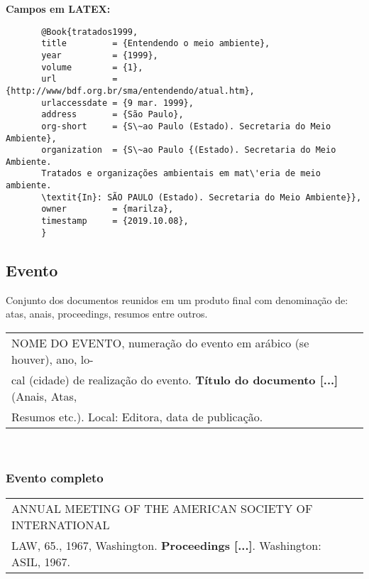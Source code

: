 	  \textbf{Campos em LATEX:} 

	  \begin{verbatim}
	   @Book{tratados1999,
	   title         = {Entendendo o meio ambiente},
	   year          = {1999},
	   volume        = {1},
	   url           = {http://www/bdf.org.br/sma/entendendo/atual.htm},
	   urlaccessdate = {9 mar. 1999},
	   address       = {São Paulo},
	   org-short     = {S\~ao Paulo (Estado). Secretaria do Meio Ambiente},
	   organization  = {S\~ao Paulo {(Estado). Secretaria do Meio Ambiente. 
	   Tratados e organizações ambientais em mat\'eria de meio ambiente. 
	   \textit{In}: SÃO PAULO (Estado). Secretaria do Meio Ambiente}},
	   owner         = {marilza},
	   timestamp     = {2019.10.08},
	   }
	 \end{verbatim}
	 
	

\subsection{Evento}

Conjunto dos documentos reunidos em um produto final com denominação
de: atas, anais, proceedings, resumos entre outros. \\

\begin{tabular}{|l|c|} \hline
	
	NOME DO EVENTO, numeração do evento em ar\'abico (se
	houver), ano, lo-\\cal (cidade) de realização do evento. \textbf{Título do documento [...]} (Anais, Atas, \\Resumos etc.). Local: Editora, data de publicação. \\\hline
\end{tabular} \\ 

\subsubsection{Evento completo} 

\begin{tabular}{|l|c|} \hline
	ANNUAL MEETING OF THE AMERICAN SOCIETY OF INTERNATIONAL \\ LAW, 65., 1967,  Washington. \textbf{Proceedings [...]}. Washington: ASIL, 1967. \\\hline
\end{tabular} \\

